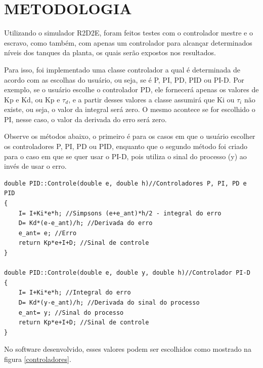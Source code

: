 \documentclass[a4paper,12pt]{article}
\begin{document}
\thispagestyle{main}

\section{METODOLOGIA}

\hspace{4ex}Utilizando o simulador R2D2E, foram feitos testes com o controlador mestre e o escravo, como também, com apenas um controlador para alcançar determinados níveis dos tanques da planta, os quais serão expostos nos resultados.

\hspace{4ex}Para isso, foi implementado uma classe controlador a qual é determinada de acordo com as escolhas do usuário, ou seja, se é P, PI, PD, PID ou PI-D. Por exemplo, se o usuário escolhe o controlador PD, ele fornecerá apenas os valores de Kp e Kd, ou Kp e $\tau_d$, e a partir desses valores a classe assumirá que Ki ou $\tau_i$ não existe, ou seja, o valor da integral será zero. O mesmo acontece se for escolhido o PI, nesse caso, o valor da derivada do erro será zero.

\hspace{4ex}Observe os métodos abaixo, o primeiro é para os casos em que o usuário escolher os controladores P, PI, PD ou PID, enquanto que o segundo método foi criado para o caso em que se quer usar o PI-D, pois utiliza o sinal do processo (y) ao invés de usar o erro.
\begin{lstlisting}
double PID::Controle(double e, double h)//Controladores P, PI, PD e PID
{
    I= I+Ki*e*h; //Simpsons (e+e_ant)*h/2 - integral do erro
    D= Kd*(e-e_ant)/h; //Derivada do erro
    e_ant= e; //Erro
    return Kp*e+I+D; //Sinal de controle
}

double PID::Controle(double e, double y, double h)//Controlador PI-D
{
    I= I+Ki*e*h; //Integral do erro
    D= Kd*(y-e_ant)/h; //Derivada do sinal do processo
    e_ant= y; //Sinal do processo
    return Kp*e+I+D; //Sinal de controle
}
\end{lstlisting}
\hspace{4ex}No software desenvolvido, esses valores podem ser escolhidos como mostrado na figura \ref{controladores}.
\end{document}

